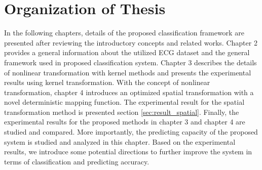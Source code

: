 \section{Organization of Thesis}

In the following chapters, details of the proposed classification framework are presented after reviewing the introductory concepts and related works. Chapter 2 provides a general information about the utilized ECG dataset and the general framework used in proposed classification system. Chapter 3 describes the details of nonlinear transformation with kernel methods and presents the experimental results using kernel transformation. With the concept of nonlinear transformation, chapter 4 introduces an optimized spatial transformation with a novel deterministic mapping function. The experimental result for the spatial transformation method is presented section \ref{sec:result_spatial}. Finally, the experimental results for the proposed methods in chapter 3 and chapter 4 are studied and compared. More importantly, the predicting capacity of the proposed system is studied and analyzed in this chapter. Based on the experimental results, we introduce some potential directions to further improve the system in terms of classification and predicting accuracy.
